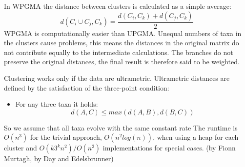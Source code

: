 In \textcolor{ALUblue}{WPGMA} the \textcolor{ALUblue}{distance between clusters} is calculated as a \textcolor{ALUblue}{simple average}:
$$d(C_i \cup C_j, C_k) = \frac{d(C_i,C_k) + d(C_j,C_k)}{2}$$
WPGMA is computationally easier than  \textcolor{ALUblue}{UPGMA}.
\textcolor{ALUred}{Unequal numbers of taxa} in the clusters cause problems, this means the distances in the original matrix \textcolor{ALUred}{do not contribute equally} to the intermediate calculations.
The branches do not preserve the original distances, the final result is therefore said to be \textcolor{ALUblue}{weighted}.

Clustering works only if the data are \textcolor{ALUblue}{ultrametric}.
Ultrametric distances are defined by the satisfaction of the \textcolor{ALUblue}{three-point condition}:
\begin{itemize}
  \item For any three taxa it holds:
  $$d(A, C) \leq max(d(A,B), d(B,C))$$
\end{itemize}

 So we assume that all taxa evolve with the same constant rate
The runtime is  $O(n^3)$ for the trivial approach, $O(n^2 log(n))$, when using a heap for each cluster
and $O(k 3^k n^2) / O(n^2)$ implementations for special cases. (by Fionn Murtagh,  by Day and Edelsbrunner)

